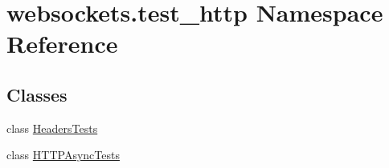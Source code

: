 \hypertarget{namespacewebsockets_1_1test__http}{}\section{websockets.\+test\+\_\+http Namespace Reference}
\label{namespacewebsockets_1_1test__http}
\subsection*{Classes}
\begin{DoxyCompactItemize}
\item 
class \hyperlink{classwebsockets_1_1test__http_1_1_headers_tests}{Headers\+Tests}
\item 
class \hyperlink{classwebsockets_1_1test__http_1_1_h_t_t_p_async_tests}{H\+T\+T\+P\+Async\+Tests}
\end{DoxyCompactItemize}
